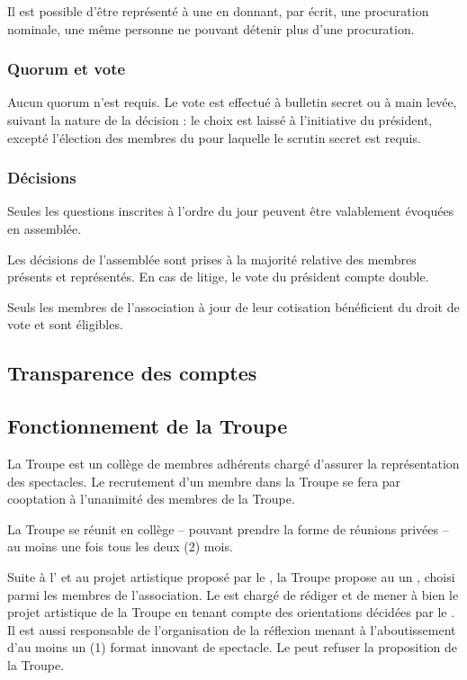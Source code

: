 \documentclass[a4paper,french,10pt]{article}
\begin{document}
Il est possible d’être représenté à une \AG{} en donnant,
par écrit, une procuration nominale, une même personne ne pouvant détenir plus
d’une procuration.

\subsubsection{Quorum et vote}
\label{sec:quorum}

Aucun quorum n'est requis. Le vote est effectué à bulletin secret ou à
main levée, suivant la nature de la décision : le choix est laissé à
l'initiative du président, excepté l'élection des membres du \bureau{}
pour laquelle le scrutin secret est requis.


\subsubsection{Décisions}
\label{sec:decisions}

Seules les questions inscrites à l’ordre du jour peuvent être
valablement évoquées en assemblée.

Les décisions de l’assemblée sont prises à la majorité relative des
membres présents et représentés. En cas de litige, le vote du
président compte double.

Seuls les membres de l’association à jour de leur cotisation
bénéficient du droit de vote et sont éligibles.

\subsection{Transparence des comptes}
\label{sec:transp-des-compt}

\subsection{Fonctionnement de la Troupe}
\label{sec:fonctionnement-troupe}
La Troupe est un collège de membres adhérents chargé d'assurer la représentation des spectacles. Le recrutement d'un membre dans la Troupe se fera par cooptation à l'unanimité des membres de la Troupe.

 La Troupe se réunit en collège -- pouvant prendre la forme de réunions privées -- au moins une fois tous les deux (2) mois.

Suite à l'\AGO{} et au projet artistique proposé par le \bureau{}, la Troupe propose au \bureau{} un \DA{}, choisi parmi les membres de l'association. Le \DA{} est chargé de rédiger et de mener à bien le projet artistique de la Troupe en tenant compte des orientations décidées par le \bureau{}. Il est aussi responsable de l'organisation de la réflexion menant à l'aboutissement d'au moins un (1) format innovant de spectacle. Le \bureau{} peut refuser la proposition de la Troupe. 
\end{document}
